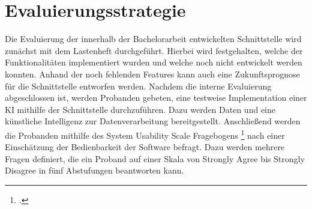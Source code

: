 \section{Evaluierungsstrategie}
Die Evaluierung der innerhalb der Bachelorarbeit entwickelten Schnittstelle wird zunächst mit dem Lastenheft durchgeführt. Hierbei wird festgehalten, welche der Funktionalitäten implementiert wurden und welche noch nicht entwickelt werden konnten. Anhand der noch fehlenden Features kann auch eine Zukunftsprognose für die Schnittstelle entworfen werden. Nachdem die interne Evaluierung abgeschlossen ist, werden Probanden gebeten, eine testweise Implementation einer KI mithilfe der Schnittstelle durchzuführen. Dazu werden Daten und eine künstliche Intelligenz zur Datenverarbeitung bereitgestellt. Anschließend werden die Probanden mithilfe des System Usability Scale Fragebogens \footcite[System Usability Scale (SUS)]{Sus} nach einer Einschätzung der Bedienbarkeit der Software befragt. Dazu werden mehrere Fragen definiert, die ein Proband auf einer Skala von \glqq Strongly Agree\grqq{} bis \glqq Strongly Disagree\grqq{} in fünf Abstufungen beantworten kann.